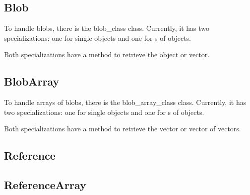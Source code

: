 \subsection{Blob}
\label{section:member_types:blob}

To handle blobs, there is the \gls{blob_class} class. Currently, it has two specializations: one for single objects and one for s of objects.



Both specializations have a  method to retrieve the object or vector.



\subsection{BlobArray}
\label{section:member_types:blob_array}

To handle arrays of blobs, there is the \gls{blob_array_class} class. Currently, it has two specializations: one for single objects and one for s of objects.



Both specializations have a  method to retrieve the vector or vector of vectors.



\subsection{Reference}
\label{section:member_types:reference}


\subsection{ReferenceArray}
\label{section:member_types:reference_array}


